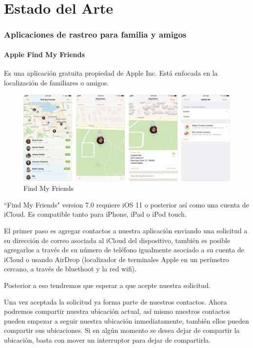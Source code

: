 \chapter{Estado del Arte}

\subsection{Aplicaciones de rastreo para familia y amigos}

\subsubsection{Apple Find My Friends}

Es una aplicación gratuita propiedad de Apple Inc. Está enfocada en la localización de familiares o amigos.

\begin{figure}[bp!]
	\centering
	\includegraphics[width=5in]{imgs/apple_findmyfriends}
	  \caption{Find My Friends}
\end{figure}

``Find My Friends" version 7.0 requiere iOS 11 o posterior así como una cuenta de iCloud. Es compatible tanto para iPhone, iPad o iPod touch.

El primer paso es agregar contactos a nuestra aplicación enviando una solicitud a su dirección de correo asociada al iCloud del dispositivo, también es posible agregarlos a través de su número de teléfono igualmente asociado a su cuenta de iCloud o usando AirDrop (localizador de terminales Apple en un perímetro cercano, a través de bluethoot y la red wifi).

Posterior a eso tendremos que esperar a que acepte nuestra solicitud.

Una vez aceptada la solicitud ya forma parte de nuestros contactos. Ahora podremos compartir nuestra ubicación actual, así mismo nuestros contactos pueden empezar a seguir nuestra ubicación inmediatamente, también ellos pueden compartir sus ubicaciones. Si en algún momento se desea dejar de compartir la ubicación, basta con mover un interruptor para dejar de compartirla.

